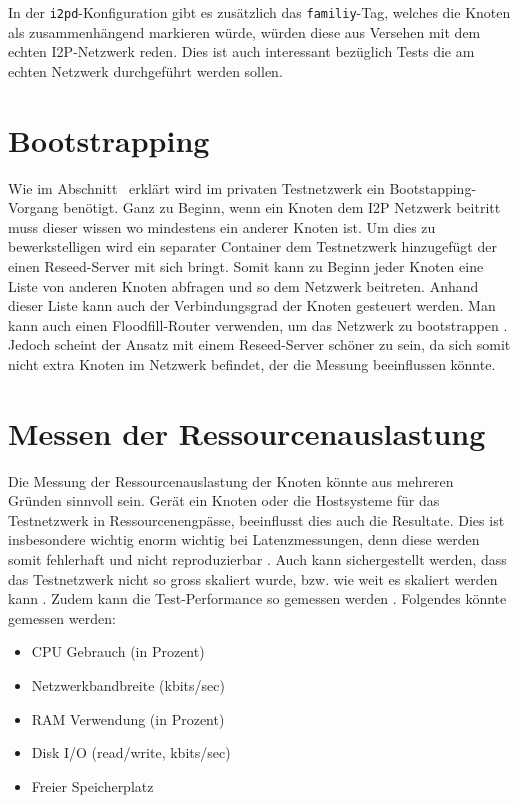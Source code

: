 In der \lstinline|i2pd|-Konfiguration gibt es zusätzlich das \lstinline|familiy|-Tag, welches die Knoten als zusammenhängend markieren würde, würden diese aus Versehen mit dem echten I2P-Netzwerk reden. Dies ist auch interessant bezüglich Tests die am echten Netzwerk durchgeführt werden sollen.


\section{Bootstrapping}

Wie im Abschnitt~ erklärt wird im privaten Testnetzwerk ein Bootstapping-Vorgang benötigt.
Ganz zu Beginn, wenn ein Knoten dem I2P Netzwerk beitritt muss dieser wissen wo mindestens ein anderer Knoten ist.
Um dies zu bewerkstelligen wird ein separater Container dem Testnetzwerk hinzugefügt der einen Reseed-Server mit sich bringt.
Somit kann zu Beginn jeder Knoten eine Liste von anderen Knoten abfragen und so dem Netzwerk beitreten.
Anhand dieser Liste kann auch der Verbindungsgrad der Knoten gesteuert werden.
Man kann auch einen Floodfill-Router verwenden, um das Netzwerk zu bootstrappen \parencite{noauthor_bootstrapping_nodate}.
Jedoch scheint der Ansatz mit einem Reseed-Server schöner zu sein, da sich somit nicht extra Knoten im Netzwerk befindet, der die Messung beeinflussen könnte.

\section{Messen der Ressourcenauslastung}\label{sec:ressourcenauslastung}


Die Messung der Ressourcenauslastung der Knoten könnte aus mehreren Gründen sinnvoll sein.
Gerät ein Knoten oder die Hostsysteme für das Testnetzwerk in Ressourcenengpässe, beeinflusst dies auch die Resultate.
Dies ist insbesondere wichtig enorm wichtig bei Latenzmessungen, denn diese werden somit fehlerhaft und nicht reproduzierbar .
Auch kann sichergestellt werden, dass das Testnetzwerk nicht so gross skaliert wurde, bzw. wie weit es skaliert werden kann .
Zudem kann die Test-Performance so gemessen werden .
Folgendes könnte gemessen werden:

\begin{itemize}
    \item CPU Gebrauch (in Prozent)
    \item Netzwerkbandbreite (kbits/sec)
    \item RAM Verwendung (in Prozent)
    \item Disk I/O (read/write, kbits/sec)
    \item Freier Speicherplatz
\end{itemize}

